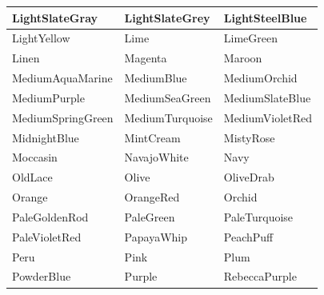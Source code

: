 \documentclass[a4paper,12pt]{article}
\begin{document}
\begin{center}
\begin{longtable}{|p{}|p{}|p{}|}
    \cellcolor[HTML]{778899} LightSlateGray    & \cellcolor[HTML]{778899} LightSlateGrey       & \cellcolor[HTML]{B0C4DE} LightSteelBlue  \\ \hline
    \cellcolor[HTML]{FFFFE0} LightYellow       & \cellcolor[HTML]{00FF00} Lime                 & \cellcolor[HTML]{32CD32} LimeGreen       \\ \hline
    \cellcolor[HTML]{FAF0E6} Linen             & \cellcolor[HTML]{FF00FF} Magenta              & \cellcolor[HTML]{800000} Maroon          \\ \hline
    \cellcolor[HTML]{66CDAA} MediumAquaMarine  & \cellcolor[HTML]{0000CD} MediumBlue           & \cellcolor[HTML]{CA55D3} MediumOrchid    \\ \hline
    \cellcolor[HTML]{9370DB} MediumPurple      & \cellcolor[HTML]{3CB371} MediumSeaGreen       & \cellcolor[HTML]{7B68EE} MediumSlateBlue \\ \hline
    \cellcolor[HTML]{00FA9A} MediumSpringGreen & \cellcolor[HTML]{48D1CC} MediumTurquoise      & \cellcolor[HTML]{C71585} MediumVioletRed \\ \hline
    \cellcolor[HTML]{191970} MidnightBlue      & \cellcolor[HTML]{F5FFFA} MintCream            & \cellcolor[HTML]{FFE4E1} MistyRose       \\ \hline
    \cellcolor[HTML]{FFE4B5} Moccasin          & \cellcolor[HTML]{FFDEAD} NavajoWhite          & \cellcolor[HTML]{000080} Navy            \\ \hline
    \cellcolor[HTML]{FDF5E6} OldLace           & \cellcolor[HTML]{808000} Olive                & \cellcolor[HTML]{6B8E23} OliveDrab       \\ \hline
    \cellcolor[HTML]{FFA500} Orange            & \cellcolor[HTML]{FF4500} OrangeRed            & \cellcolor[HTML]{DA70D6} Orchid          \\ \hline
    \cellcolor[HTML]{EEE8AA} PaleGoldenRod     & \cellcolor[HTML]{98FB98} PaleGreen            & \cellcolor[HTML]{AFEEEE} PaleTurquoise   \\ \hline
    \cellcolor[HTML]{DB7093} PaleVioletRed     & \cellcolor[HTML]{FFEFD5} PapayaWhip           & \cellcolor[HTML]{FFDAB9} PeachPuff       \\ \hline
    \cellcolor[HTML]{CD853F} Peru              & \cellcolor[HTML]{FFC0CB} Pink                 & \cellcolor[HTML]{DDA0DD} Plum            \\ \hline
    \cellcolor[HTML]{B0E0E6} PowderBlue        & \cellcolor[HTML]{800080} Purple               & \cellcolor[HTML]{663399} RebeccaPurple   \\ \hline

\end{longtable}
\end{center}
\end{document}

